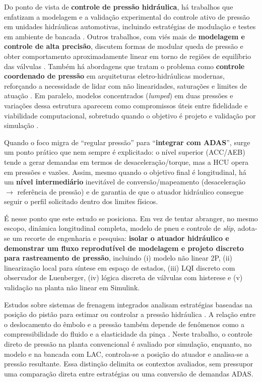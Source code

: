 Do ponto de vista de \textbf{controle de pressão hidráulica}, há trabalhos que enfatizam a modelagem e a validação experimental do controle ativo de pressão em unidades hidráulicas automotivas, incluindo estratégias de modulação e testes em ambiente de bancada \cite{HouhuaJing2022}. Outros trabalhos, com viés mais de \textbf{modelagem e controle de alta precisão}, discutem formas de modular queda de pressão e obter comportamento aproximadamente linear em torno de regiões de equilíbrio das válvulas \cite{ChenLv2017}. Também há abordagens que tratam o problema como \textbf{controle coordenado de pressão} em arquiteturas eletro-hidráulicas modernas, reforçando a necessidade de lidar com não linearidades, saturações e limites de atuação \cite{PressureCoordinatedControl2023}. Em paralelo, modelos concentrados (\textit{lumped}) em duas pressões e variações dessa estrutura aparecem como compromissos úteis entre fidelidade e viabilidade computacional, sobretudo quando o objetivo é projeto e validação por simulação \cite{Lv2014,ZengYangHuang2023}.

Quando o foco migra de ``regular pressão'' para ``\textbf{integrar com ADAS}'', surge um ponto prático que nem sempre é explicitado: o nível superior (ACC/AEB) tende a gerar demandas em termos de desaceleração/torque, mas a HCU opera em pressões e vazões. Assim, mesmo quando o objetivo final é longitudinal, há um \textbf{nível intermediário} inevitável de conversão/mapeamento (desaceleração $\rightarrow$ referência de pressão) e de garantia de que o atuador hidráulico consegue seguir o perfil solicitado dentro dos limites físicos.

É nesse ponto que este estudo se posiciona. Em vez de tentar abranger, no mesmo escopo, dinâmica longitudinal completa, modelo de pneu e controle de \textit{slip}, adota-se um recorte de engenharia e pesquisa: \textbf{isolar o atuador hidráulico e demonstrar um fluxo reprodutível de modelagem e projeto discreto para rastreamento de pressão}, incluindo (i) modelo não linear 2P, (ii) linearização local para síntese em espaço de estados, (iii) LQI discreto com observador de Luenberger, (iv) lógica discreta de válvulas com histerese e (v) validação na planta não linear em Simulink.

Estudos sobre sistemas de frenagem integrados analisam estratégias baseadas na posição do pistão para estimar ou controlar a pressão hidráulica \cite{xiong2021piston}. A relação entre o deslocamento do êmbolo e a pressão também depende de fenômenos como a compressibilidade do fluido e a elasticidade da pinça \cite{breuer2008brake}. Neste trabalho, o controle direto de pressão na planta convencional é avaliado por simulação, enquanto, no modelo e na bancada com LAC, controla-se a posição do atuador e analisa-se a pressão resultante. Essa distinção delimita os contextos avaliados, sem pressupor uma comparação direta entre estratégias ou uma conversão de demandas ADAS.

